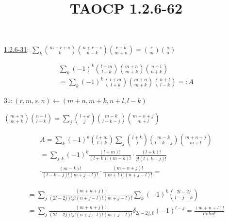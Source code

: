 \documentclass{article}
\title{TAOCP 1.2.6\mbox{-}62}
\begin{document}
\maketitle

\href{./1.2.6-31.pdf}{1.2.6\mbox{-}31}: \( \sum_{k} \binom{m-r+s}{k}\binom{n+r-s}{n-k}\binom{r+k}{m+n} = \binom{r}{m}\binom{s}{n} \)

\begin{multline*}
\sum_{k} {(-1)}^{k}\binom{l+m}{l+k}\binom{m+n}{m+k}\binom{n+l}{n+k} \\
= \sum_{k} {(-1)}^{k}\binom{l+m}{l+k}\binom{m+n}{m+k}\binom{n+l}{l-k} =: A
\end{multline*}

\( 31: (r,m,s,n) \leftarrow (m+n, m+k, n+l, l-k) \)

\( \binom{m+n}{m+k} \binom{n+l}{l-k} = \sum_{j} \binom{l+k}{j}\binom{m-k}{l-k-j}\binom{m+n+j}{m+l} \)

\begin{multline*}
A = \sum_{k} {(-1)}^{k}\binom{l+m}{l+k}\sum_{j} \binom{l+k}{j}\binom{m-k}{l-k-j}\binom{m+n+j}{m+l} \\
= \sum_{j,k} {(-1)}^{k} \frac{(l+m)!}{(l+k)!(m-k)!} \cdot \frac{(l+k)!}{j!(l+k-j)!} \\
\cdot \frac{(m-k)!}{(l-k-j)!(m+j-l)!} \cdot \frac{(m+n+j)!}{(m+l)!(n+j-l)!} =
\end{multline*}

\begin{multline*}
= \sum_{j} \frac{(m+n+j)!}{(2l-2j)!j!(n+j-l)!(m+j-l)!} \sum_{k} {(-1)}^{k} \binom{2l-2j}{l-j+k} \\
= \sum_{j} \frac{(m+n+j)!}{(2l-2j)!j!(n+j-l)!(m+j-l)!} \delta_{2l-2j, 0} {(-1)}^{l-j} = \frac{(m+n+l)!}{l!n!m!}
\end{multline*}
\end{document}
